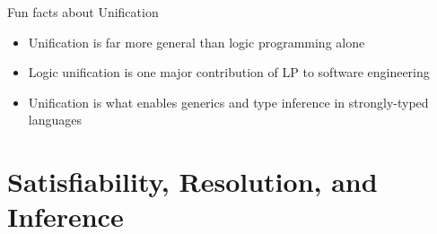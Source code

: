 \documentclass[presentation]{beamer}\mode<presentation>{\usetheme{AMSBolognaFC}}
\begin{document}
\begin{frame}{Fun facts about Unification}
    \begin{itemize}
        \item Unification is far more general than logic programming alone
        
        \vfill

        \item Logic unification is one major contribution of LP to \alert{software engineering}
        
        \vfill

        \item Unification is what enables \alert{generics} and \alert{type inference} in strongly-typed languages
    \end{itemize}
\end{frame}

\section{Satisfiability, Resolution, and Inference}
\end{document}
